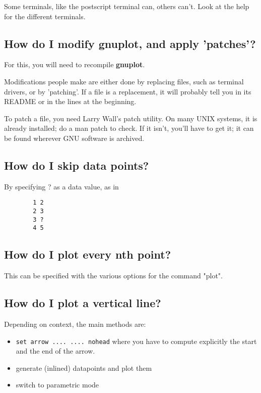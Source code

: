 \documentclass[a4paper,11pt]{article}
\newcommand{\gnuplot}{\textbf{gnuplot}}
\begin{document}
Some terminals, like the postscript terminal can, others can't.
Look at the help for the different terminals.


\subsection{How do I modify \gnuplot, and apply 'patches'?}

For this, you will need to recompile \gnuplot.

Modifications people make are either done by replacing files,
such as terminal drivers, or by 'patching'. If a file is a
replacement, it will probably tell you in its README or in the
lines at the beginning.

To patch a file, you need Larry Wall's patch utility. On many
UNIX systems, it is already installed; do a man patch to check.
If it isn't, you'll have to get it; it can be found wherever
GNU software is archived.


\subsection{How do I skip data points?}

By specifying ? as a data value, as in
\begin{verbatim}
        1 2
        2 3
        3 ?
        4 5
\end{verbatim}


\subsection{How do I plot every nth point?}

This can be specified with the various options for the command "plot".


\subsection{How do I plot a vertical line?}

Depending on context, the main methods are:
\begin{itemize}
\item \verb+set arrow .... .... nohead+ where you have to compute
explicitly the start and the end of the arrow.
\item generate (inlined) datapoints and plot them
\item switch to parametric mode
\end{itemize}
\end{document}
